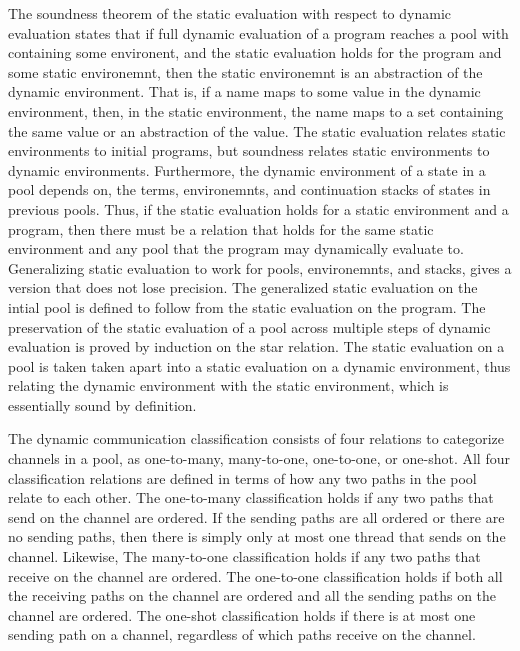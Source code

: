 \documentclass[letterpaper, 11pt]{extarticle}
\begin{document}
The soundness theorem of the static evaluation with respect to dynamic evaluation states that if full dynamic evaluation
of a program reaches a pool with containing some environent, and the static evaluation holds for the program and some
static environemnt, then the static environemnt is an abstraction of the dynamic environment.  That is, if a name maps
to some value in the dynamic environment, then, in the static environment, the name maps to a set containing the same value
or an abstraction of the value. The static evaluation relates static environments to initial programs,
but soundness relates static environments
to dynamic environments. Furthermore, the dynamic environment of a state in a pool depends on, the terms, environemnts,
and continuation stacks of states in previous pools.
Thus, if the static evaluation holds for a static environment and a program,
then there must be a relation that holds for the same static environment and
any pool that the program may dynamically evaluate to. 
Generalizing static evaluation to work for pools, environemnts, and stacks, gives a version that does not lose precision.
The generalized static evaluation on the intial pool is defined to follow from the static evaluation on the program.
The preservation of the static evaluation of a pool across multiple steps of dynamic evaluation is proved by induction on
the star relation. The static evaluation on a pool is taken taken apart into a static evaluation on a dynamic environment,
thus relating the dynamic environment with the static environment, which is essentially sound by definition. 


The dynamic communication classification consists of four relations to categorize channels in a pool, as one-to-many,
many-to-one, one-to-one, or one-shot. All four classification relations are defined in terms of how any two paths   
in the pool relate to each other. The one-to-many classification holds if any two paths that send on the channel are ordered. 
If the sending paths are all ordered or there are no sending paths, then there is simply only at most one thread that
sends on the channel. Likewise, The many-to-one classification holds if any two paths that receive on the channel are ordered.
The one-to-one classification holds if both all the receiving paths on the channel are ordered and all the sending paths on the
channel are ordered.  The one-shot classification holds if there is at most one sending path on a channel, regardless
of which paths receive on the channel.
\end{document}
